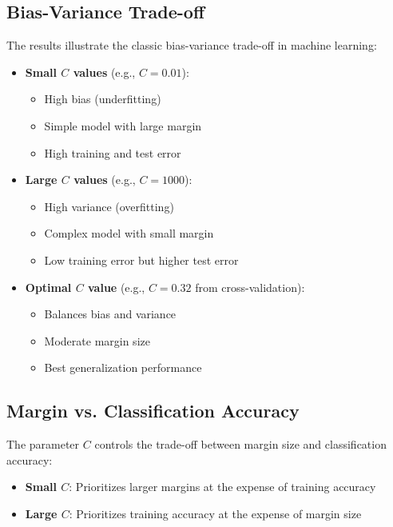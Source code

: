 \documentclass{article}
\begin{document}
\subsection{Bias-Variance Trade-off}
The results illustrate the classic bias-variance trade-off in machine learning:

\begin{itemize}
    \item \textbf{Small $C$ values} (e.g., $C = 0.01$):
    \begin{itemize}
        \item High bias (underfitting)
        \item Simple model with large margin
        \item High training and test error
    \end{itemize}
    
    \item \textbf{Large $C$ values} (e.g., $C = 1000$):
    \begin{itemize}
        \item High variance (overfitting)
        \item Complex model with small margin
        \item Low training error but higher test error
    \end{itemize}
    
    \item \textbf{Optimal $C$ value} (e.g., $C = 0.32$ from cross-validation):
    \begin{itemize}
        \item Balances bias and variance
        \item Moderate margin size
        \item Best generalization performance
    \end{itemize}
\end{itemize}

\subsection{Margin vs. Classification Accuracy}
The parameter $C$ controls the trade-off between margin size and classification accuracy:

\begin{itemize}
    \item \textbf{Small $C$}: Prioritizes larger margins at the expense of training accuracy
    \item \textbf{Large $C$}: Prioritizes training accuracy at the expense of margin size
\end{itemize}
\end{document}
